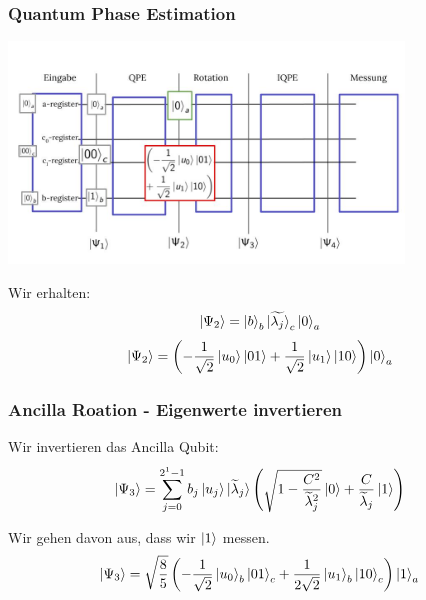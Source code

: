 \begin{frame}
    \frametitle{Quantum Phase Estimation}
    \begin{center}
    \includegraphics[width=10.5cm]{img/example_circuit/example_circuit_2.jpg}
    \end{center}

    Wir erhalten:
    $$\ket{\Psi_2} = \ket{b}_b \ket{\widetilde{\lambda_j}}_c\ket{0}_a$$
    $$\ket{\Psi_2} =\left(-\frac{1}{\sqrt{2}} \ket{u_0} \ket{01} +\frac{1}{\sqrt{2}}  
    \ket{u_1} \ket{10} \right)  \ket{0}_a$$

\end{frame}

\begin{frame}
    \frametitle{Ancilla Roation - Eigenwerte invertieren}
    Wir invertieren das Ancilla Qubit:
    $$ \ket{\Psi_3} = \sum_{j=0}^{2^{1}-1} b_j \ket{u_j} \ket{\widetilde{\lambda}_j} \left(\sqrt{1-\frac{C^2}{\widetilde{\lambda}_j^2}}\ket{0} + \frac{C}{\widetilde{\lambda}_j} \ket{1}\right)$$


    \hfil

    Wir gehen davon aus, dass wir $\ket{1}$ messen.
    $$  \ket{\Psi_3} =\sqrt{\frac{8}{5}}\left(-\frac{1}{\sqrt{2}} \ket{u_0}_b\ket{01}_c +\frac{1}{2\sqrt{2}} \ket{u_1}_b\ket{10}_c\right)\ket{1}_a $$
\end{frame}

